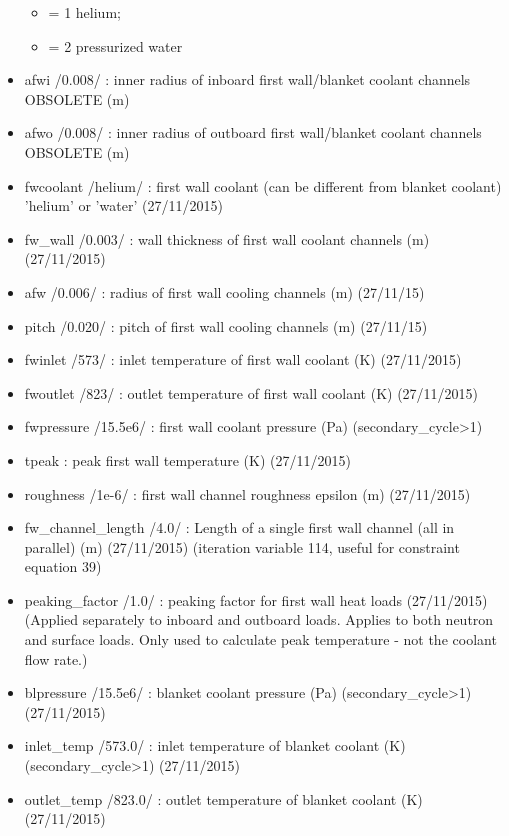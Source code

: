 \documentclass[]{article}
\providecommand{\tightlist}{%
  \setlength{\itemsep}{0pt}\setlength{\parskip}{0pt}}
\begin{document}
\begin{itemize}
  \begin{itemize}
  \tightlist
  \item
    = 1 helium;
  \item
    = 2 pressurized water
  \end{itemize}
\item
  afwi /0.008/ : inner radius of inboard first wall/blanket coolant
  channels OBSOLETE (m)
\item
  afwo /0.008/ : inner radius of outboard first wall/blanket coolant
  channels OBSOLETE (m)
\item
  fwcoolant /helium/ : first wall coolant (can be different from blanket
  coolant) 'helium' or 'water' (27/11/2015)
\item
  fw\_wall /0.003/ : wall thickness of first wall coolant channels (m)
  (27/11/2015)
\item
  afw /0.006/ : radius of first wall cooling channels (m) (27/11/15)
\item
  pitch /0.020/ : pitch of first wall cooling channels (m) (27/11/15)
\item
  fwinlet /573/ : inlet temperature of first wall coolant (K)
  (27/11/2015)
\item
  fwoutlet /823/ : outlet temperature of first wall coolant (K)
  (27/11/2015)
\item
  fwpressure /15.5e6/ : first wall coolant pressure (Pa)
  (secondary\_cycle\textgreater{}1)
\item
  tpeak : peak first wall temperature (K) (27/11/2015)
\item
  roughness /1e-6/ : first wall channel roughness epsilon (m)
  (27/11/2015)
\item
  fw\_channel\_length /4.0/ : Length of a single first wall channel (all
  in parallel) (m) (27/11/2015) (iteration variable 114, useful for
  constraint equation 39)
\item
  peaking\_factor /1.0/ : peaking factor for first wall heat loads
  (27/11/2015) (Applied separately to inboard and outboard loads.
  Applies to both neutron and surface loads. Only used to calculate peak
  temperature - not the coolant flow rate.)
\item
  blpressure /15.5e6/ : blanket coolant pressure (Pa)
  (secondary\_cycle\textgreater{}1) (27/11/2015)
\item
  inlet\_temp /573.0/ : inlet temperature of blanket coolant (K)
  (secondary\_cycle\textgreater{}1) (27/11/2015)
\item
  outlet\_temp /823.0/ : outlet temperature of blanket coolant (K)
  (27/11/2015)


\end{itemize}
\end{document}
